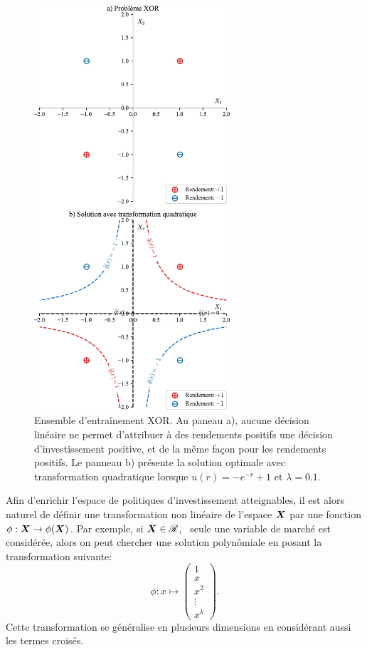 \begin{figure}[p]
  \centering
  \includegraphics[width=0.65\textwidth]{../experiments/fig/pres/pres5_fr.pdf}
  \caption[Problème XOR]{Ensemble d'entraînement XOR. Au paneau a), aucune décision
    linéaire ne permet d'attribuer à des rendements positifs une décision d'investissement
    positive, et de la même façon pour les rendements positifs. Le panneau b) présente la
    solution optimale avec transformation quadratique lorsque $u(r)=-e^{-r}+1$ et
    $\lambda=0.1$.}
  \label{fig_xor}
\end{figure}


Afin d'enrichir l'espace de politiques d'investissement atteignables, il est alors naturel
de définir une transformation non linéaire de l'espace $\bm{X}$ par une fonction
$\phi:\bm{X}\to\phi(\bm{X})$. Par exemple, si $\bm{X} \in \mathscr{R}$, \ie\ seule une variable de marché est considérée,
alors on peut chercher une solution polynômiale en posant la transformation suivante:
\begin{equation}
  \phi:x \mapsto
  \begin{pmatrix}
    1 \\ x \\ x^2 \\ \vdots \\ x^k
  \end{pmatrix}.
\end{equation}
Cette transformation se généralise en plusieurs dimensions en considérant aussi les termes
croisés.

